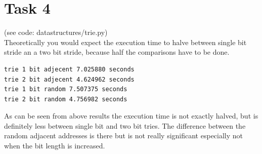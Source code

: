 \documentclass{article}
\begin{document}
\section{Task 4}
(see code: datastructures/trie.py) \\
Theoretically you would expect the execution time to halve between single bit stride an a two bit stride, because half the comparisons have to be done. 

\begin{verbatim}
trie 1 bit adjecent 7.025880 seconds
trie 2 bit adjecent 4.624962 seconds
trie 1 bit random 7.507375 seconds
trie 2 bit random 4.756982 seconds
\end{verbatim}

As can be seen from above results the execution time is not exactly halved, but is definitely less between single bit and two bit tries. The difference between the random adjacent addresses is there but is not really significant especially not when the bit length is increased.
\end{document}
